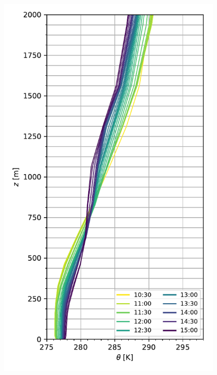\begin{figure}[H]
	\begin{minipage}{0.5\linewidth}
	\end{minipage}%
	\begin{minipage}{0.5\linewidth}
	\end{minipage}%
	
	\begin{minipage}{0.5\linewidth}
		\centering
		\includegraphics[width=0.9\linewidth,trim={0cm 5mm 0cm 0mm},clip]{Imagenes/06/bol/mean_pbl}%
	\end{minipage}%

\end{figure}

